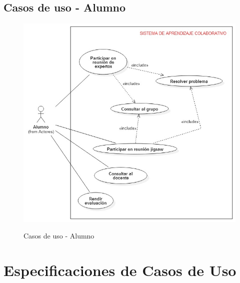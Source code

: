 \subsection{Casos de uso - Alumno}
\begin{figure}[!h]
  \centering
  \includegraphics[scale=0.6]{figuras/casosdeuso/DCU_Alumno.jpg}\\
  \caption[Casos de uso - Alumno]{Casos de uso - Alumno}
  \label{fig:cus-alumno}
\end{figure}
\clearpage
\section{Especificaciones de Casos de Uso}
